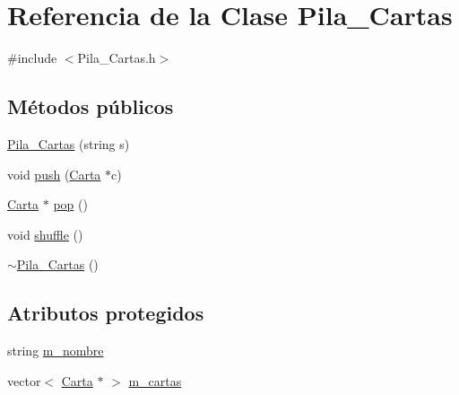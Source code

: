 \hypertarget{class_pila___cartas}{\section{Referencia de la Clase Pila\-\_\-\-Cartas}
\label{class_pila___cartas}
}


{\ttfamily \#include $<$Pila\-\_\-\-Cartas.\-h$>$}

\subsection*{Métodos públicos}
\begin{DoxyCompactItemize}
\item 
\hyperlink{class_pila___cartas_a6313e1d13af3d7fd693c2c503be2c9ba}{Pila\-\_\-\-Cartas} (string s)
\item 
void \hyperlink{class_pila___cartas_a38950fbd276ea47da30fc72fd5d1df1f}{push} (\hyperlink{class_carta}{Carta} $\ast$c)
\item 
\hyperlink{class_carta}{Carta} $\ast$ \hyperlink{class_pila___cartas_a8c78892c723b9da4ee14617f7f440a95}{pop} ()
\item 
void \hyperlink{class_pila___cartas_a519b6facaa7c395b9bf550bdf12e4be5}{shuffle} ()
\item 
\hyperlink{class_pila___cartas_a6678bf21cd468fd7c4808347597e10f8}{$\sim$\-Pila\-\_\-\-Cartas} ()
\end{DoxyCompactItemize}
\subsection*{Atributos protegidos}
\begin{DoxyCompactItemize}
\item 
string \hyperlink{class_pila___cartas_a8e8da97e9a50cd472c745df138b5bf08}{m\-\_\-nombre}
\item 
vector$<$ \hyperlink{class_carta}{Carta} $\ast$ $>$ \hyperlink{class_pila___cartas_a368fb39691e2398459f5db68ca3d4f51}{m\-\_\-cartas}
\end{DoxyCompactItemize}


